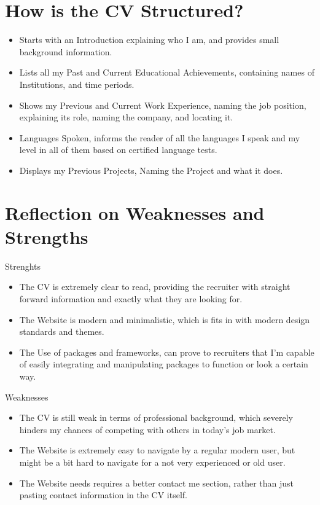 \documentclass[12pt, letterpaper]{article}
\begin{document}
\section{How is the CV Structured?}
    \begin{itemize}
        \item Starts with an Introduction explaining who I am, and provides small background information.
        \item Lists all my Past and Current Educational Achievements, containing names of Institutions, and time periods.
        \item Shows my Previous and Current Work Experience, naming the job position, explaining its role, naming the company, and locating it.
        \item Languages Spoken, informs the reader of all the languages I speak and my level in all of them based on certified language tests.
        \item Displays my Previous Projects, Naming the Project and what it does.
    \end{itemize}
\section{Reflection on Weaknesses and Strengths}
    Strenghts
    \begin{itemize}
        \item The CV is extremely clear to read, providing the recruiter with straight forward information and exactly what they are looking for.
        \item The Website is modern and minimalistic, which is fits in with modern design standards and themes.
        \item The Use of packages and frameworks, can prove to recruiters that I'm capable of easily integrating and manipulating packages to function or look a certain way.
    \end{itemize}
    Weaknesses
    \begin{itemize}
        \item The CV is still weak in terms of professional background, which severely hinders my chances of competing with others in today's job market.
        \item The Website is extremely easy to navigate by a regular modern user, but might be a bit hard to navigate for a not very experienced or old user.
        \item The Website needs requires a better contact me section, rather than just pasting contact information in the CV itself.
    \end{itemize}
\end{document}
